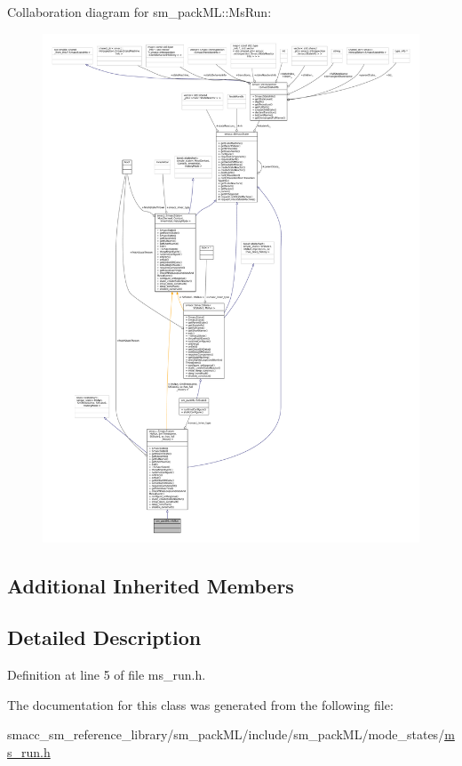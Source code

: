Collaboration diagram for sm\+\_\+pack\+ML\+:\+:Ms\+Run\+:
\nopagebreak
\begin{figure}[H]
\begin{center}
\leavevmode
\includegraphics[width=350pt]{classsm__packML_1_1MsRun__coll__graph}
\end{center}
\end{figure}
\subsection*{Additional Inherited Members}


\subsection{Detailed Description}


Definition at line 5 of file ms\+\_\+run.\+h.



The documentation for this class was generated from the following file\+:\begin{DoxyCompactItemize}
\item 
smacc\+\_\+sm\+\_\+reference\+\_\+library/sm\+\_\+pack\+M\+L/include/sm\+\_\+pack\+M\+L/mode\+\_\+states/\hyperlink{sm__packML_2include_2sm__packML_2mode__states_2ms__run_8h}{ms\+\_\+run.\+h}\end{DoxyCompactItemize}
